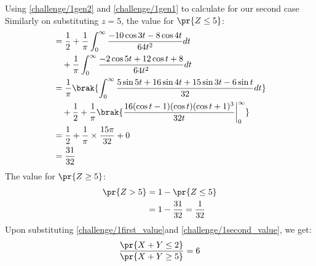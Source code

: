Using \eqref{challenge/1gen2} and \eqref{challenge/1gen1} to calculate for our second case
Similarly on substituting $z=5$, the value for $\pr{Z\leq 5}$:
\begin{align}
\nonumber
    &=\frac{1}{2} +\frac{1}{\pi}\int_0^\infty\frac{-10\cos{3t}-8\cos{4t}}{64t^2}dt\\&\quad +\frac{1}{\pi}\int_0^\infty\frac{-2\cos{5t}+12\cos{t}+8}{64t^2}dt\\ \nonumber
    &=\frac{1}{\pi}\brak{\int_0^\infty\frac{5\sin{5t}+16\sin{4t}+15\sin{3t}-6\sin{t}}{32}dt}\\
    &\quad+\frac{1}{2}+\frac{1}{\pi}\brak{\frac{16(\cos{t}-1)(\cos{t})(\cos{t}+1)^3}{32t}\bigg|_0^\infty}\\
    &=\frac{1}{2}+\frac{1}{\pi}\times\frac{15\pi}{32} + 0\\
    &=\frac{31}{32}
\end{align}
The value for $\pr{Z\geq 5}$:
\begin{align}
    \pr{Z>5}&=1-\pr{Z\leq 5}\\
    &=1-\frac{31}{32}=\frac{1}{32}\label{challenge/1second_value}
\end{align}
Upon substituting \eqref{challenge/1first_value}and \eqref{challenge/1second_value}, we get:
\begin{align}
    \frac{\pr{X+Y \leq 2}}{\pr{X+Y \geq 5}} = 6
\end{align}